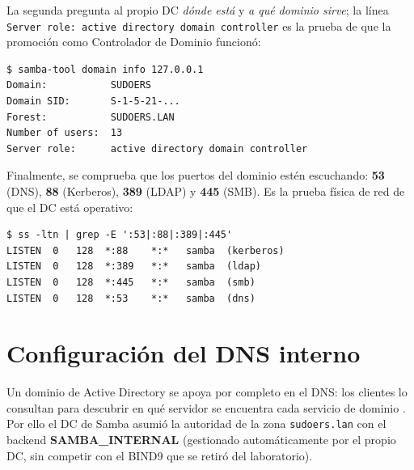 La segunda pregunta al propio DC \emph{dónde está} y \emph{a qué dominio
sirve}; la línea \texttt{Server role: active directory domain controller}
es la prueba de que la promoción como Controlador de Dominio funcionó:

\begin{lstlisting}[style=terminal]
$ samba-tool domain info 127.0.0.1
Domain:           SUDOERS
Domain SID:       S-1-5-21-...
Forest:           SUDOERS.LAN
Number of users:  13
Server role:      active directory domain controller
\end{lstlisting}


Finalmente, se comprueba que los puertos del dominio estén escuchando:
\textbf{53} (DNS), \textbf{88} (Kerberos), \textbf{389} (LDAP) y \textbf{445}
(SMB). Es la prueba física de red de que el DC está operativo:

\begin{lstlisting}[style=terminal]
$ ss -ltn | grep -E ':53|:88|:389|:445'
LISTEN  0   128  *:88    *:*   samba  (kerberos)
LISTEN  0   128  *:389   *:*   samba  (ldap)
LISTEN  0   128  *:445   *:*   samba  (smb)
LISTEN  0   128  *:53    *:*   samba  (dns)
\end{lstlisting}


\section{Configuración del DNS interno}

Un dominio de Active Directory se apoya por completo en el DNS: los clientes
lo consultan para descubrir en qué servidor se encuentra cada servicio de
dominio \citep{rfc1035}. Por ello el DC de Samba asumió la autoridad de la
zona \texttt{sudoers.lan} con el backend \textbf{SAMBA\_INTERNAL} (gestionado
automáticamente por el propio DC, sin competir con el BIND9 que se retiró del
laboratorio).

